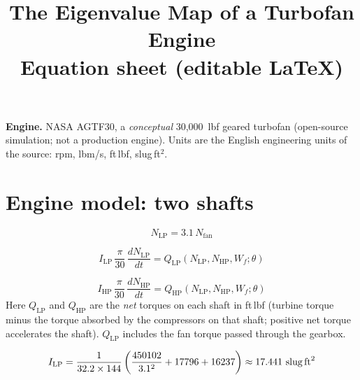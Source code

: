 \documentclass[11pt,a4paper]{article}
\title{The Eigenvalue Map of a Turbofan Engine\\ \large Equation sheet (editable \LaTeX)}
\author{}
\date{}
\begin{document}
\maketitle

\textbf{Engine.} NASA AGTF30, a \emph{conceptual} 30{,}000~lbf geared turbofan
(open-source simulation; not a production engine). Units are the English engineering
units of the source: rpm, lbm/s, ft\,lbf, slug\,ft$^2$.

\section{Engine model: two shafts}

\begin{equation}
  N_{\mathrm{LP}} = 3.1\, N_{\mathrm{fan}}
  \label{eq:gear}
\end{equation}

\begin{equation}
  I_{\mathrm{LP}}\,\frac{\pi}{30}\,\frac{dN_{\mathrm{LP}}}{dt}
  = Q_{\mathrm{LP}}\!\left(N_{\mathrm{LP}}, N_{\mathrm{HP}}, W_f;\theta\right)
  \label{eq:shaft-lp}
\end{equation}

\begin{equation}
  I_{\mathrm{HP}}\,\frac{\pi}{30}\,\frac{dN_{\mathrm{HP}}}{dt}
  = Q_{\mathrm{HP}}\!\left(N_{\mathrm{LP}}, N_{\mathrm{HP}}, W_f;\theta\right)
  \label{eq:shaft-hp}
\end{equation}
Here $Q_{\mathrm{LP}}$ and $Q_{\mathrm{HP}}$ are the \emph{net} torques on each shaft in
ft\,lbf (turbine torque minus the torque absorbed by the compressors on that shaft;
positive net torque accelerates the shaft). $Q_{\mathrm{LP}}$ includes the fan torque
passed through the gearbox.

\begin{equation}
  I_{\mathrm{LP}} = \frac{1}{32.2 \times 144}
  \left( \frac{450102}{3.1^{2}} + 17796 + 16237 \right)
  \approx 17.441\ \text{slug\,ft}^2
  \label{eq:inertia-lp}
\end{equation}
\end{document}
